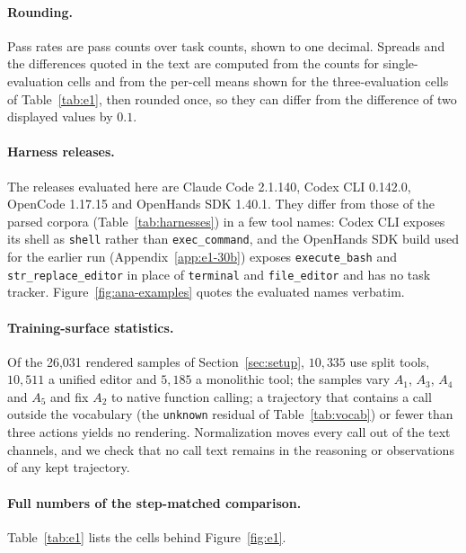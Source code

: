 \documentclass{article} %
\newcommand{\claudecode}{Claude Code}
\newcommand{\opencode}{OpenCode}
\newcommand{\codexcli}{Codex CLI}
\newcommand{\openhands}{OpenHands SDK}   %
\newcommand{\numsurfaces}{26{,}031}       %
\begin{document}
\paragraph{Rounding.} Pass rates are pass counts over task counts, shown to
one decimal. Spreads and the differences quoted in the text are computed from
the counts for single-evaluation cells and from the per-cell means shown for
the three-evaluation cells of Table~\ref{tab:e1}, then rounded once, so they
can differ from the difference of two displayed values by $0.1$.

\paragraph{Harness releases.} The releases evaluated here are \claudecode{}
2.1.140, \codexcli{} 0.142.0, \opencode{} 1.17.15 and \openhands{} 1.40.1.
They differ from those of the parsed corpora (Table~\ref{tab:harnesses}) in a
few tool names:
\codexcli{} exposes its shell as \texttt{shell} rather than
\texttt{exec\_command}, and the \openhands{} build used for the earlier run
(Appendix~\ref{app:e1-30b}) exposes \texttt{execute\_bash} and
\texttt{str\_replace\_editor} in place of \texttt{terminal} and
\texttt{file\_editor} and has no task tracker. Figure~\ref{fig:ana-examples}
quotes the evaluated names verbatim.

\paragraph{Training-surface statistics.} Of the \numsurfaces{} rendered
samples of Section~\ref{sec:setup}, $10{,}335$ use split tools, $10{,}511$ a
unified editor and $5{,}185$ a monolithic tool; the samples vary $A_1$, $A_3$,
$A_4$ and $A_5$ and fix $A_2$ to native function calling; a trajectory that
contains a call outside the vocabulary (the \texttt{unknown} residual of
Table~\ref{tab:vocab}) or fewer than three actions yields no rendering.
Normalization moves every call out of the text channels, and we check that no call text remains
in the reasoning or observations of any kept trajectory.

\paragraph{Full numbers of the step-matched comparison.}
Table~\ref{tab:e1} lists the cells behind Figure~\ref{fig:e1}.
\end{document}
